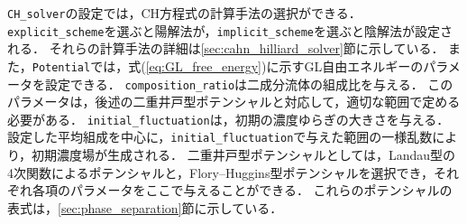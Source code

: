 \documentclass[pdflatex,a4paper,10pt,ja=standard]{bxjsarticle}
\begin{document}
\verb|CH_solver|の設定では，CH方程式の計算手法の選択ができる．
\verb|explicit_scheme|を選ぶと陽解法が，\verb|implicit_scheme|を選ぶと陰解法が設定される．
それらの計算手法の詳細は\ref{sec:cahn_hilliard_solver}節に示している．
また，\verb|Potential|では，式(\ref{eq:GL_free_energy})に示すGL自由エネルギーのパラメータを設定できる．
\verb|composition_ratio|は二成分流体の組成比を与える．
このパラメータは，後述の二重井戸型ポテンシャルと対応して，適切な範囲で定める必要がある．
\verb|initial_fluctuation|は，初期の濃度ゆらぎの大きさを与える．
設定した平均組成を中心に，\verb|initial_fluctuation|で与えた範囲の一様乱数により，初期濃度場が生成される．
二重井戸型ポテンシャルとしては，Landau型の4次関数によるポテンシャルと，Flory--Huggins型ポテンシャルを選択でき，それぞれ各項のパラメータをここで与えることができる．
これらのポテンシャルの表式は，\ref{sec:phase_separation}節に示している．
\end{document}
